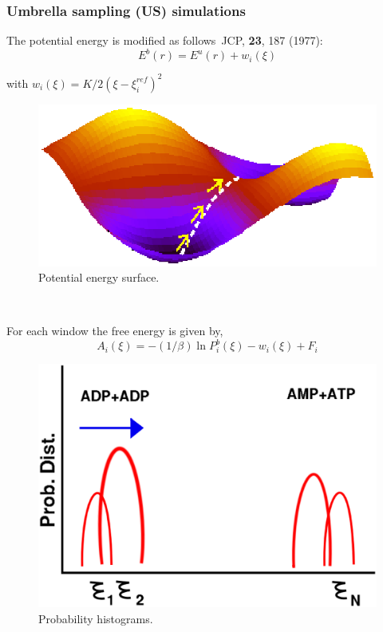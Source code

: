 \documentclass{beamer}
\newcommand\FourQuad[4]{%
    \begin{minipage}[b][.35\textheight][t]{.47\textwidth}#1\end{minipage}\hfill%
    \begin{minipage}[b][.35\textheight][t]{.47\textwidth}#2\end{minipage}\\[0.5em]
    \begin{minipage}[b][.35\textheight][t]{.47\textwidth}#3\end{minipage}\hfill
    \begin{minipage}[b][.35\textheight][t]{.47\textwidth}#4\end{minipage}%
}
\begin{document}
\begin{frame}
\frametitle{Umbrella sampling (US) simulations}
 { 
\FourQuad%
{ The potential energy is modified as
follows~{\scriptsize JCP, {\bf 23}, 187 (1977)}:
\begin{equation*} E^{b}(r) = E^{u}(r)+w_i (\xi)
\end{equation*}

with  $w_i(\xi)=K/2(\xi -\xi^{ref}_i)^2$ 

}%
{\begin{figure}
\includegraphics[scale=0.28]{surface_umbrella.eps}
\caption{{\scriptsize  Potential energy surface. }}
\end{figure}
}%
{

For each window the free energy is given by,
\begin{equation*}
A_i(\xi) = -(1/\beta) \ln P^b _i(\xi) - w_i(\xi) + F_i
\end{equation*}


}%
{
\begin{figure}
\includegraphics[scale=0.09]{prob_dist.eps}
\caption{{\scriptsize  Probability histograms. }}
\end{figure}
}
}
\end{frame}
\end{document}

